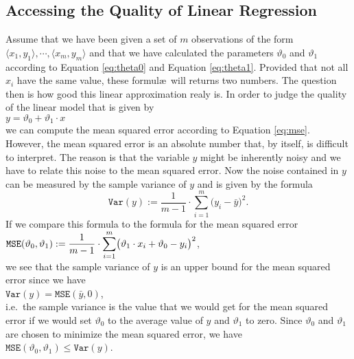 \subsection{Accessing the Quality of Linear Regression}
Assume that we have been given a set of $m$ observations of the form $\langle x_1, y_1\rangle, \cdots, \langle x_m, y_m\rangle$  
and that we have calculated the parameters $\vartheta_0$ and $\vartheta_1$ according to Equation
\ref{eq:theta0} and Equation \ref{eq:theta1}.  Provided that not all $x_i$ have the same value, these
formul\ae\ will returns two numbers.  The question then is how good this linear approximation realy is.  In
order to judge the quality of the linear model that is given by 
\\[0.2cm]
\hspace*{1.3cm}
$y = \vartheta_0 + \vartheta_1 \cdot x$
\\[0.2cm]
we can compute the mean squared error according to Equation \ref{eq:mse}.  However, the mean squared error 
is an absolute number that, by itself, is difficult to interpret.  The reason is that the variable $y$ might be
inherently noisy and we have to relate this noise to the mean squared error.  Now the noise contained in $y$
can be measured by the sample variance of $y$ and is given by the formula
\begin{equation}
  \label{eq:var}
  \mathtt{Var}(y) := \frac{1}{m-1} \cdot \sum\limits_{i=1}^m \bigl(y_i - \bar{y}\bigr)^2.
\end{equation}
If we compare this formula to the formula for the mean squared error
\\[0.2cm]
\hspace*{1.3cm}
$\displaystyle\mathtt{MSE}(\vartheta_0, \vartheta_1) := 
  \frac{1}{m-1} \cdot\sum\limits_{i=1}^m \bigl(\vartheta_1 \cdot x_i + \vartheta_0 - y_i\bigr)^2
$,
\\[0.2cm]
we see that the sample variance of $y$ is an upper bound for the mean squared error since we have
\\[0.2cm]
\hspace*{1.3cm}
$\mathtt{Var}(y) = \mathtt{MSE}(\bar{y}, 0)$,
\\[0.2cm]
i.e.~the sample variance is the value that we would get for the mean squared error if we would set $\vartheta_0$ to
the average value of $y$ and $\vartheta_1$ to zero.  Since $\vartheta_0$ and $\vartheta_1$ are chosen to
minimize the mean squared error, we have
\\[0.2cm]
\hspace*{1.3cm}
$\mathtt{MSE}(\vartheta_0, \vartheta_1) \leq \mathtt{Var}(y)$.
